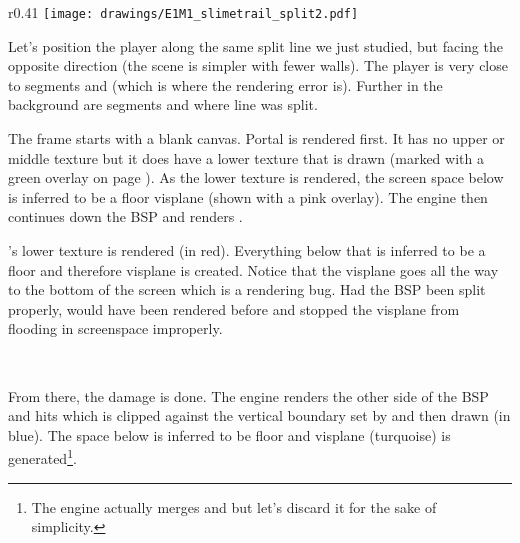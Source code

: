 \begin{minipage}{0.47\textwidth}
\end{minipage}
\hspace{4mm}
\begin{minipage}{0.47\textwidth}
\end{minipage} 
\par
\vspace{1mm}
\par



\par
\begin{wrapfigure}[20]{r}{0.41\textwidth}
\centering
\texttt{[image: drawings/E1M1\_slimetrail\_split2.pdf]}
\end{wrapfigure}
\par
\vspace{10pt}
Let's position the player along the same split line we just studied, but facing the opposite direction (the scene is simpler with fewer walls). The player is very close to segments  and  (which is where the rendering error is). Further in the background are segments  and  where line  was split.\par
\vspace{10pt}
The frame starts with a blank canvas. Portal  is rendered first. It has no upper or middle texture but it does have a lower texture that is drawn (marked with a green overlay on page \pageref{leak_opposite_explained.png}). As the lower texture is rendered, the screen space below is inferred to be a floor visplane  (shown with a pink overlay). The engine then continues down the BSP and renders .\par
\vspace{10pt}

 's lower texture is rendered (in red). Everything below that is inferred to be a floor and therefore visplane  is created. Notice that the visplane goes all the way to the bottom of the screen which is a rendering bug. Had the BSP been split properly,  would have been rendered before  and stopped the visplane from flooding in screenspace improperly.\\
\par
 

\\
\label{leak_opposite_explained.png}
\par
From there, the damage is done. The engine renders the other side of the BSP and hits  which is clipped against the vertical boundary set by  and then drawn (in blue). The space below  is inferred to be floor and visplane  (turquoise) is generated\footnote{The engine actually merges  and  but let's discard it for the sake of simplicity.}.


